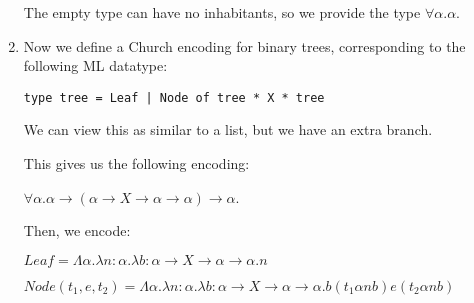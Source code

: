 \begin{enumerate}
    The empty type can have no inhabitants, so we provide the type $\forall \alpha. \alpha$.

  \item
    Now we define a Church encoding for binary trees, corresponding to the following ML datatype:

    \texttt{type tree = Leaf | Node of tree * X * tree}

    We can view this as similar to a list, but we have an extra branch.

    This gives us the following encoding:

    $\forall \alpha. \alpha \rightarrow (\alpha \rightarrow X \rightarrow \alpha \rightarrow \alpha) \rightarrow \alpha$.

    Then, we encode:

    $Leaf = \Lambda \alpha. \lambda n : \alpha. \lambda b : \alpha \rightarrow X \rightarrow \alpha \rightarrow \alpha. n$

    $Node(t_1, e, t_2) = \Lambda \alpha. \lambda n : \alpha. \lambda b : \alpha \rightarrow X \rightarrow \alpha \rightarrow \alpha. b (t_1 \alpha n b) e (t_2 \alpha n b)$
        
\end{enumerate}

